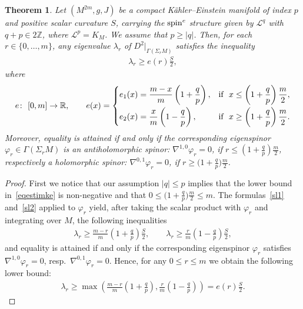\documentclass[10pt,a4paper]{amsart}
\numberwithin{equation}{section}
\newtheorem{thm}{Theorem}[section]
\theoremstyle{definition}
\begin{document}
\begin{thm}\label{estimke}
Let $(M^{2m}, g, J)$ be a compact K\"ahler--Einstein manifold of index $p$ and positive scalar curvature $S$, carrying the ${\mathop{\rm spin}^c}$ structure given by $\mathcal{L}^q$ with $q+p\in 2\mathbb{Z}$, where $\mathcal{L}^p=K_M$. We assume that  $p\geq |q|$.
Then, for each $r\in\{0, \dots, m\}$, any eigenvalue $\lambda_r$ of $D^2|_{\Gamma(\Sigma_r M )}$ satisfies the inequality
\begin{gather}\label{eqestimke}
 \lambda_r\geq e(r)\frac{S}{2},
 \end{gather}
where
\begin{gather*}
e\colon \ [0,m]\to\mathbb{R}, \qquad  e(x)=\begin{cases}
   \displaystyle    e_1(x)=\frac{m-x}{m}\left(1+\frac{q}{p}\right), & \displaystyle\text{if} \ \ x\leq \left(1+\frac{q}{p}\right)\frac{m}{2},
   \vspace{1mm}\\
    \displaystyle    e_2(x)=\frac{x}{m}\left(1-\frac{q}{p}\right),  & \displaystyle\text{if} \ \ x\geq \left(1+\frac{q}{p}\right)\frac{m}{2}.                                                                                                                        \end{cases}
\end{gather*}
Moreover, equality is attained if and only if the corresponding eigenspinor $\varphi_r\in\Gamma(\Sigma_r M)$ is an antiholomorphic spinor: $\nabla^{1,0}\varphi_r=0$, if $r\leq \left(1+\frac{q}{p}\right)\frac{m}{2}$, respectively a holomorphic spinor: $\nabla^{0,1}\varphi_r=0$, if $r \geq \big(1+\frac{q}{p}\big)\frac{m}{2}$.
\end{thm}


\begin{proof}
First we notice that our assumption $|q|\leq p$ implies that the lower bound in~\eqref{eqestimke} is non-negative and that $0\leq \big(1+\frac{q}{p}\big)\frac{m}{2}\leq m$. The formulas~\eqref{sl1} and~\eqref{sl2} applied to $\varphi_r$ yield, after taking the scalar product with $\varphi_r$ and integrating over $M$, the following inequalities
 \begin{gather*}\lambda_r\geq \frac{m-r}{m}\left(1+\frac{q}{p}\right)\frac{S}{2},\qquad
 \lambda_r\geq \frac{r}{m}\left(1-\frac{q}{p}\right)\frac{S}{2},\end{gather*}
and equality is attained if and only if the corresponding eigenspinor $\varphi_r$ satisf\/ies $\nabla^{1,0}\varphi_r=0$, resp.~$\nabla^{0,1}\varphi_r=0$. Hence, for any $0\leq r\leq m$ we obtain the following lower bound:
\begin{gather*}
\lambda_r\geq \max\left(\frac{m-r}{m}\left(1+\frac{q}{p}\right),\frac{r}{m}\left(1-\frac{q}{p}\right)\right)=  e(r)\frac{S}{2}.\tag*{\qed}
\end{gather*}
\renewcommand{\qed}{}
\end{proof}
\end{document}
